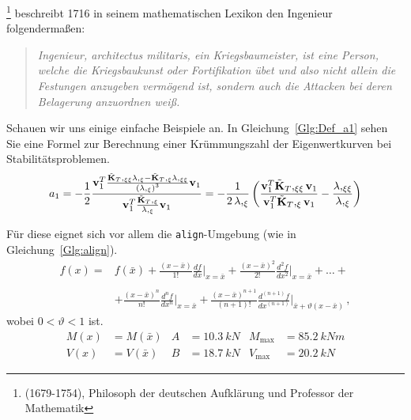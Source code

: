 %
%
\footnote{ (1679-1754), Philosoph der deutschen Aufklärung und Professor der Mathematik}
%
beschreibt 1716 in seinem mathematischen Lexikon den Ingenieur folgendermaßen:
%
\begin{quotation}
\emph{
Ingenieur, architectus militaris, ein Kriegsbaumeister, ist eine Person, welche die Kriegsbaukunst oder Fortifikation übet und also nicht allein die Festungen anzugeben vermögend ist, sondern auch die Attacken bei deren Belagerung anzuordnen weiß.}
\end{quotation}

%
Schauen wir uns einige einfache Beispiele an.
In Gleichung~\eqref{Glg:Def_a1} sehen Sie eine Formel zur Berechnung einer Krümmungszahl der Eigenwertkurven bei Stabilitätsproblemen. 
%
\begin{equation}
   a_1=-\frac{1}{2}
        \frac{\mathbf{v}_1^T 
                    \frac{\tilde{\mathbf{K}}_{T},_{\xi\xi}\lambda,_{\xi} -
                          \tilde{\mathbf{K}}_{T},_{\xi}\lambda,_{\xi\xi}}
                         {\left(\lambda,_{\xi}\right)^3}
                         \mathbf{v}_1
             }
             {\mathbf{v}_1^T 
             \frac{\tilde{\mathbf{K}}_{T},_{\xi}}{\lambda,_{\xi}} 
             \mathbf{v}_1}
      = -\frac{1}{2\,\lambda,_{\xi}}
         \left(
               \frac{\vKTxxv}     %
                    {\vKTxv}      %
             - \frac{\lambda,_{\xi\xi}}{\lambda,_{\xi}}
         \right)
\label{Glg:Def_a1}
\end{equation}
%

%
Für diese eignet sich vor allem die \texttt{align}-Umgebung (wie in Gleichung~\eqref{Glg:align}).
%
\begin{align}
   f(x) = & f(\bar x) + \frac{(x - \bar x)}{1!} \frac{df}{dx}
   \Bigg|_{x = \bar x} +
   \frac{(x - \bar x)^2}{2!} \frac{d^2 f}{d x^2} \Bigg|_{x = \bar x} +
   \dots + \nonumber \\
   \nonumber \\
          & +\frac{(x - \bar x)^n}{n!} \frac{d^n f}{d x^n} 
            \Bigg|_{x = \bar x} +
            \frac{(x - \bar x)^{n+1}}{(n + 1)!}
            \frac{d^{(n + 1)} f}{d x^{(n + 1)}} 
            \Bigg|_{\bar x + \vartheta (x - \bar x)} \, ,
\label{Glg:align}
\end{align}
%
wobei $0 < \vartheta < 1$ ist.
%
\begin{align}
   M(x) & =  M(\bar x) &  A & = \SI{10,3}{kN}  &  M_{\max} & = \SI{85,2}{kNm}
\nonumber \\
   V(x) & = V(\bar x)  &  B & = \SI{18,7}{kN}  &  V_{\max} & = \SI{20,2}{kN}
\label{Glg:align2}
\end{align}
